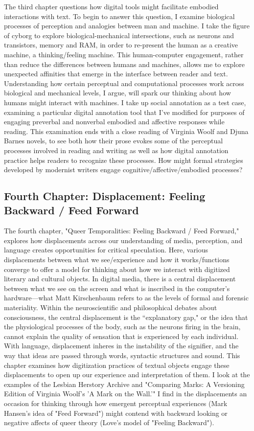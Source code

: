 \documentclass[11pt]{article}
\begin{document}
The third chapter questions how digital tools might facilitate
embodied interactions with text. To begin to answer this question, I
examine biological processes of perception and analogies between man
and machine. I take the figure of cyborg to explore
biological-mechanical intersections, such as neurons and transistors,
memory and RAM, in order to re-present the human as a creative
machine, a thinking/feeling machine. This human-computer engagement,
rather than reduce the differences between humans and machines, allows
me to explore unexpected affinities that emerge in the interface
between reader and text. Understanding how certain perceptual and
computational processes work across biological and mechanical levels,
I argue, will spark our thinking about how humans might interact with
machines. I take up social annotation as a test case, examining a
particular digital annotation tool that I've modified for purposes of
engaging preverbal and nonverbal embodied and affective responses
while reading. This examination ends with a close reading of Virginia
Woolf and Djuna Barnes novels, to see both how their prose evokes some
of the perceptual processes involved in reading and writing as well as
how digital annotation practice helps readers to recognize these
processes. How might formal strategies developed by modernist writers
engage cognitive/affective/embodied processes?

\subsection{Fourth Chapter: Displacement: Feeling Backward / Feed Forward}
\label{sec:orgb751409}

The fourth chapter, "Queer Temporalities: Feeling Backward / Feed
Forward," explores how displacements across our understanding of
media, perception, and language creates opportunities for critical
speculation. Here, various displacements between what we
see/experience and how it works/functions converge to offer a model
for thinking about how we interact with digitized literary and
cultural objects. In digital media, there is a central displacement
between what we see on the screen and what is inscribed in the
computer’s hardware---what Matt Kirschenbaum refers to as the levels
of formal and forensic materiality. Within the neuroscientific and
philosophical debates about consciousness, the central displacement is
the “explanatory gap," or the idea that the physiological processes of
the body, such as the neurons firing in the brain, cannot explain the
quality of sensation that is experienced by each individual. With
language, displacement inheres in the instability of the signifier,
and the way that ideas are passed through words, syntactic structures
and sound. This chapter examines how digitization practices of textual
objects engage these displacements to open up our experience and
interpretation of them. I look at the examples of the Lesbian Herstory
Archive and "Comparing Marks: A Versioning Edition of Virginia Woolf's
'A Mark on the Wall.'" I find in the displacements an occasion for
thinking through how emergent perceptual experiences (Mark Hansen's
idea of "Feed Forward") might contend with backward looking or
negative affects of queer theory (Love's model of "Feeling Backward").
\end{document}
